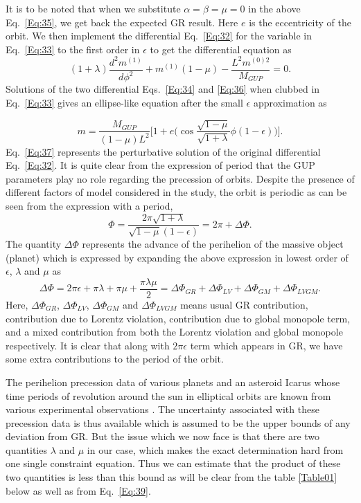 \documentclass[aps,amsmath,amssymb,showpacs,showkeys]{revtex4}
\begin{document}
It is to be noted that when we substitute $\alpha=\beta=\mu=0$ in the above 
Eq.\ \eqref{Eq:35}, we get back the expected GR result. Here $e$ is the 
eccentricity of the orbit. We then implement the differential 
Eq.\ \eqref{Eq:32} for the variable in Eq.\ \eqref{Eq:33} to the first order 
in $\epsilon$ to get the differential equation as
\begin{equation}
 (1+\lambda)\frac{d^2 m^{(1)}}{d\phi^2}+m^{(1)}(1-\mu)-\frac{L^2 m^{(0)2}}{M_{GUP}}=0.
\label{Eq:36}
\end{equation}
Solutions of the two differential Eqs.\ \eqref{Eq:34} and \eqref{Eq:36} when 
clubbed in Eq.\ \eqref{Eq:33} gives an ellipse-like equation after the small 
$\epsilon$ approximation as

\begin{equation}
 m=\frac{M_{GUP}}{(1-\mu)L^2}\bigg[1+e\Big(\cos \frac{\sqrt{1-\mu}}{\sqrt{1+\lambda}}\phi (1-\epsilon)\Big)\bigg].
\label{Eq:37}
\end{equation}
Eq.\ \eqref{Eq:37} represents the perturbative solution of the original 
differential Eq.\ \eqref{Eq:32}. It is quite clear from the expression of 
period that the GUP parameters play no role regarding the precession of orbits. Despite the 
presence of different factors of model considered in the study, the orbit is 
periodic as can be seen from the expression with a period,
\begin{equation}
\Phi=\frac{2\pi \sqrt{1+\lambda}}{\sqrt{1-\mu}(1-\epsilon)}=2\pi+\Delta \Phi.
\label{Eq:38}
\end{equation}
The quantity $\Delta \Phi$ represents the advance of the perihelion of the 
massive object (planet) which is expressed by expanding the above expression 
in lowest order of $\epsilon$, $\lambda$ and $\mu$ as
\begin{equation}
\Delta \Phi=2\pi \epsilon+ \pi \lambda+\pi \mu +\frac{\pi \lambda\mu}{2} =\Delta \Phi_{GR} +\Delta\Phi_{LV}+\Delta \Phi_{GM}+\Delta \Phi_{LVGM}.
\label{Eq:39}
\end{equation}
 Here, $\Delta \Phi_{GR}$, $\Delta\Phi_{LV}$, $\Delta \Phi_{GM}$ and $\Delta \Phi_{LVGM}$ means usual GR contribution, 
contribution due to Lorentz violation, contribution due to global monopole 
term, and a mixed contribution from both the Lorentz violation and global 
monopole respectively. 
It is clear that along with $2\pi \epsilon$ term which appears in GR, we have 
some extra contributions to the period of the orbit. 

The perihelion precession data of various planets and an asteroid Icarus whose 
time periods of revolution around the sun in elliptical orbits are known from 
various experimental observations \cite{17}. The uncertainty associated with 
these precession data is thus available which is assumed to be the upper 
bounds of any deviation from GR. But the issue which we now face is that 
there are two quantities $\lambda$ and $\mu$ in our case, which makes the 
exact determination hard from one single constraint equation. Thus we can 
estimate that the product of these two quantities is less than this bound as 
will be clear from the table \ref{Table01} below as well as from 
Eq.\ \eqref{Eq:39}.
\end{document}
